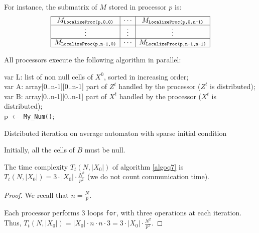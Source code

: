 For instance, the submatrix of $M$ stored in processor $p$ is:
\[
   \begin{array}{ | c | c | c |} \hline
    M_{\texttt{LocalizeProc(p,0,0)}} & \cdots & M_{\texttt{LocalizeProc(p,0,n-1)}}\\ \hline
    \vdots & \vdots & \vdots \\ \hline
    M_{\texttt{LocalizeProc(p,n-1,0)}} & \cdots & M_{\texttt{LocalizeProc(p,n-1,n-1)}}\\ \hline
  \end{array}
\]

All processors execute the following algorithm in parallel:

\begin{algorithm}[H]
    \DontPrintSemicolon
    \LinesNotNumbered
    var L: list of non null cells of $X^0$, sorted in increasing order; \\
    var A: array[0..n-1][0..n-1] part of $Z^t$ handled by the processor ($Z^t$ is distributed); \\
    var B: array[0..n-1][0..n-1] part of $X^t$ handled by the processor ($X^t$ is distributed); \\ 
    p $\leftarrow$ \texttt{My\_Num()};\\
\caption{Distributed iteration on average automaton with sparse initial condition\label{algoq7}}
\end{algorithm}

Initially, all the cells of $B$ must be null.

\begin{prop}
 The time complexity $T_t(N,|X_0|)$ of algorithm \ref{algoq7} is $T_t(N,|X_0|) = 3 \cdot |X_0| \cdot \frac{N^2}{p^2}$ (we do not count communication time).
\end{prop}

\begin{proof}
 We recall that $n = \frac{N}{p}$.
 
 Each processor performs 3 loops \texttt{for}, with three operations at each iteration. Thus, $T_t(N,|X_0|) = |X_0| \cdot n \cdot n \cdot 3 = 3 \cdot |X_0| \cdot \frac{N^2}{p^2}$.
\end{proof}

